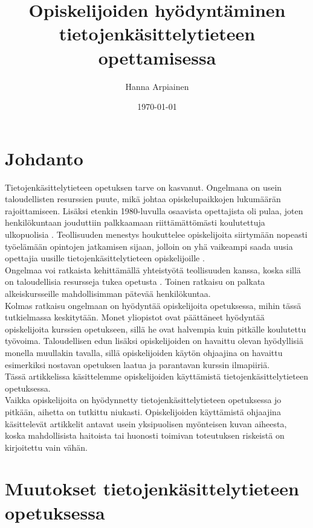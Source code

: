 \documentclass[finnish]{tktltiki2}
\title{﻿Opiskelijoiden hyödyntäminen tietojenkäsittelytieteen opettamisessa}
\author{Hanna Arpiainen}
\date{\today}
\theoremstyle{definition}
\theoremstyle{remark}
\begin{document}
\maketitle
\makeabstract

\tableofcontents
\newpage





\section{Johdanto}
Tietojenkäsittelytieteen opetuksen tarve on kasvanut. Ongelmana on usein taloudellisten resurssien puute, mikä johtaa opiskelupaikkojen lukumäärän rajoittamiseen. Lisäksi etenkin 1980-luvulla osaavista opettajista oli pulaa, joten henkilökuntaan jouduttiin palkkaamaan riittämättömästi koulutettuja ulkopuolisia \cite{Roberts11}. Teollisuuden menestys houkuttelee opiskelijoita siirtymään nopeasti työelämään opintojen jatkamisen sijaan, jolloin on yhä vaikeampi saada uusia opettajia uusille tietojenkäsittelytieteen opiskelijoille \cite{Roberts99}.
\\
Ongelmaa voi ratkaista kehittämällä yhteistyötä teollisuuden kanssa, koska sillä on taloudellisia resursseja tukea opetusta \cite{Roberts11}. Toinen ratkaisu on palkata alkeiskursseille mahdollisimman pätevää henkilökuntaa. 
\\
Kolmas ratkaisu ongelmaan on hyödyntää opiskelijoita opetuksessa, mihin tässä tutkielmassa keskitytään. Monet yliopistot ovat päättäneet hyödyntää opiskelijoita kurssien opetukseen, sillä he ovat halvempia kuin pitkälle koulutettu työvoima. Taloudellisen edun lisäksi opiskelijoiden on havaittu olevan hyödyllisiä monella muullakin tavalla, sillä opiskelijoiden käytön ohjaajina on havaittu esimerkiksi nostavan opetuksen laatua ja parantavan kurssin ilmapiiriä.
\\
Tässä artikkelissa käsittelemme opiskelijoiden käyttämistä tietojenkäsittelytieteen opetuksessa. 
\\
Vaikka opiskelijoita on hyödynnetty tietojenkäsittelytieteen opetuksessa jo pitkään, aihetta on tutkittu niukasti. Opiskelijoiden käyttämistä ohjaajina käsittelevät artikkelit antavat usein yksipuolisen myönteisen kuvan aiheesta, koska mahdollisista haitoista tai huonosti toimivan toteutuksen riskeistä on kirjoitettu vain vähän. 

\section{Muutokset tietojenkäsittelytieteen opetuksessa}
\end{document}
